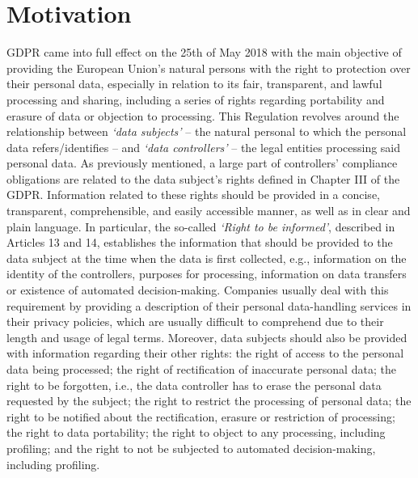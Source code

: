 \section{Motivation}
\label{sec:motivation}

GDPR came into full effect on the 25th of May 2018 with the main objective of providing the European Union’s natural persons with the right to protection over their personal data, especially in relation to its fair, transparent, and lawful processing and sharing, including a series of rights regarding portability and erasure of data or objection to processing.
This Regulation revolves around the relationship between \textit{`data subjects'} -- the natural personal to which the personal data refers/identifies -- and \textit{`data controllers'} -- the legal entities processing said personal data.
As previously mentioned, a large part of controllers' compliance obligations are related to the data subject’s rights defined in Chapter III of the GDPR.
Information related to these rights should be provided in a concise, transparent, comprehensible, and easily accessible manner, as well as in clear and plain language.
In particular, the so-called \textit{`Right to be informed'}, described in Articles 13 and 14, establishes the information that should be provided to the data subject at the time when the data is first collected, e.g., information on the identity of the controllers, purposes for processing, information on data transfers or existence of automated decision-making.
Companies usually deal with this requirement by providing a description of their personal data-handling services in their privacy policies, which are usually difficult to comprehend due to their length and usage of legal terms.
Moreover, data subjects should also be provided with information regarding their other rights:
the right of access to the personal data being processed; the right of rectification of inaccurate personal data; the right to be forgotten, i.e., the data controller has to erase the personal data requested by the subject; the right to restrict the processing of personal data; the right to be notified about the rectification, erasure or restriction of processing; the right to data portability; the right to object to any processing, including profiling; and the right to not be subjected to automated decision-making, including profiling.

